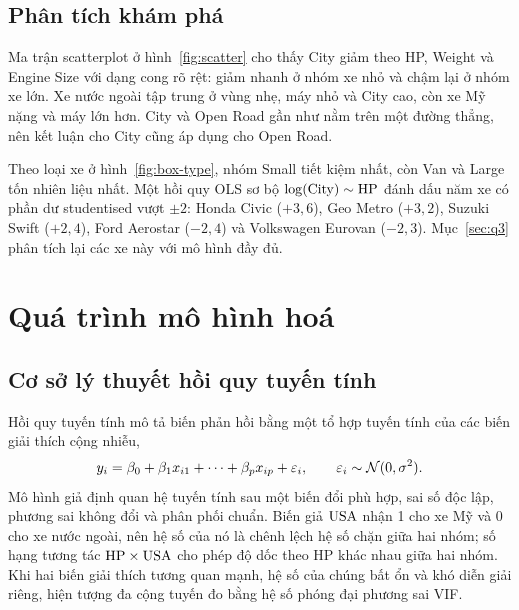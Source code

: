 \documentclass[12pt,a4paper]{report}
\begin{document}
\section{Phân tích khám phá}
\label{sec:eda}

Ma trận scatterplot ở hình~\ref{fig:scatter} cho thấy City giảm theo HP, Weight
và Engine Size với dạng cong rõ rệt: giảm nhanh ở nhóm xe nhỏ và chậm lại ở nhóm
xe lớn. Xe nước ngoài tập trung ở vùng nhẹ, máy nhỏ và City cao, còn xe Mỹ nặng
và máy lớn hơn. City và Open Road gần như nằm trên một đường thẳng, nên kết luận
cho City cũng áp dụng cho Open Road.


Theo loại xe ở hình~\ref{fig:box-type}, nhóm Small tiết kiệm nhất, còn Van và
Large tốn nhiên liệu nhất. Một hồi quy OLS sơ bộ $\log(\mathrm{City}) \sim \mathrm{HP}$ đánh dấu
năm xe có phần dư studentised vượt $\pm 2$: Honda Civic ($+3{,}6$), Geo Metro
($+3{,}2$), Suzuki Swift ($+2{,}4$), Ford Aerostar ($-2{,}4$) và Volkswagen
Eurovan ($-2{,}3$). Mục~\ref{sec:q3} phân tích lại các xe này với mô hình đầy đủ.


\chapter{Quá trình mô hình hoá}
\label{sec:modeling}

\section{Cơ sở lý thuyết hồi quy tuyến tính}

Hồi quy tuyến tính mô tả biến phản hồi bằng một tổ hợp tuyến tính của các biến
giải thích cộng nhiễu,
%
\begin{equation}
  \label{eq:linreg}
  y_i = \beta_0 + \beta_1 x_{i1} + \dots + \beta_p x_{ip} + \varepsilon_i,
  \qquad \varepsilon_i \sim \mathcal{N}(0, \sigma^2).
\end{equation}
%
Mô hình giả định quan hệ tuyến tính sau một biến đổi phù hợp, sai số độc lập,
phương sai không đổi và phân phối chuẩn. Biến giả $\mathrm{USA}$ nhận 1 cho xe Mỹ và 0
cho xe nước ngoài, nên hệ số của nó là chênh lệch hệ số chặn giữa hai nhóm; số
hạng tương tác $\mathrm{HP} \times \mathrm{USA}$ cho phép độ dốc theo HP khác nhau giữa hai
nhóm. Khi hai biến giải thích tương quan mạnh, hệ số của chúng bất ổn và khó
diễn giải riêng, hiện tượng đa cộng tuyến đo bằng hệ số phóng đại phương sai
VIF.
\end{document}
